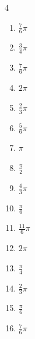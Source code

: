 \begin{multicols}{4}
\begin{enumerate}
  \item $\displaystyle \frac{7}{6}\pi$

  \item $\displaystyle \frac{3}{4}\pi$

  \item $\displaystyle \frac{7}{6}\pi$

  \item $\displaystyle 2\pi$

  \item $\displaystyle \frac{2}{3}\pi$

  \item $\displaystyle \frac{5}{6}\pi$

  \item $\displaystyle \pi$

\columnbreak %

  \item $\displaystyle \frac{\pi}{2}$

  \item $\displaystyle \frac{4}{3}\pi$

  \item $\displaystyle \frac{\pi}{6}$

  \item $\displaystyle \frac{11}{6}\pi$

  \item $\displaystyle 2\pi$

  \item $\displaystyle \frac{\pi}{4}$

  \item $\displaystyle \frac{2}{3}\pi$

  \item $\displaystyle \frac{\pi}{6}$

  \item $\displaystyle \frac{7}{6}\pi$


\end{enumerate}
\end{multicols}
